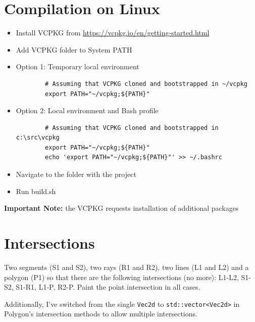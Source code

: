 \documentclass[12pt,a4paper,english]{article}
\begin{document}
\section{Compilation on Linux}

\begin{itemize}
    \item Install VCPKG from \url{https://vcpkg.io/en/getting-started.html}
    \item Add VCPKG folder to System PATH
    \item Option 1: Temporary local environment
    \begin{verbatim}
        # Assuming that VCPKG cloned and bootstrapped in ~/vcpkg
        export PATH="~/vcpkg;${PATH}"
    \end{verbatim}

    \item Option 2: Local environment and Bash profile
    \begin{verbatim}
        # Assuming that VCPKG cloned and bootstrapped in c:\src\vcpkg
        export PATH="~/vcpkg;${PATH}"
        echo 'export PATH="~/vcpkg;${PATH}"' >> ~/.bashrc
    \end{verbatim}

    \item Navigate to the folder with the project
    \item Run build.sh
\end{itemize}
\textbf{Important Note:} the VCPKG requests installation of additional packages

\section{Intersections}

Two segments (S1 and S2), two rays (R1 and R2), two lines (L1 and L2) and a polygon (P1) so that there are the following intersections (no more): L1-L2, S1-S2, S1-R1, L1-P, R2-P. Paint the point intersection in all cases.

Additionally, I've switched from the single \lstinline{Vec2d} to \lstinline{std::vector<Vec2d>} in Polygon's intersection methods to allow multiple intersections.
\end{document}
